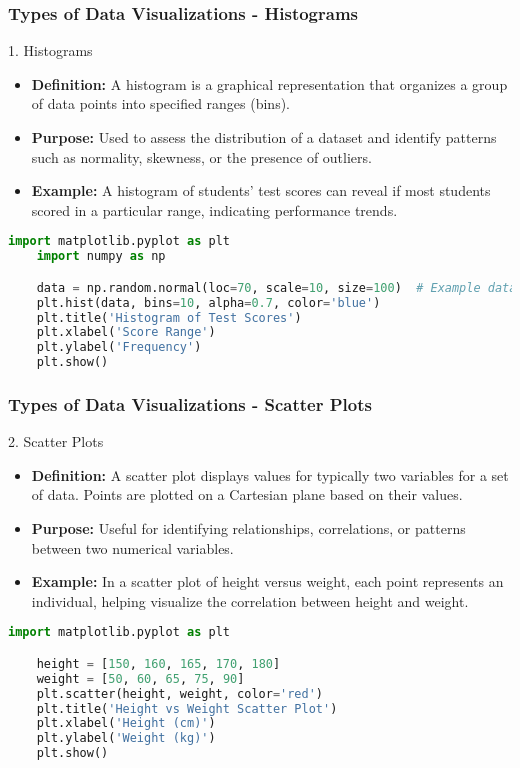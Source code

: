 \documentclass[aspectratio=169]{beamer}
\begin{document}
\begin{frame}[fragile]
    \frametitle{Types of Data Visualizations - Histograms}
    \begin{block}{1. Histograms}
        \begin{itemize}
            \item \textbf{Definition:} A histogram is a graphical representation that organizes a group of data points into specified ranges (bins). 
            \item \textbf{Purpose:} Used to assess the distribution of a dataset and identify patterns such as normality, skewness, or the presence of outliers.
            \item \textbf{Example:} A histogram of students' test scores can reveal if most students scored in a particular range, indicating performance trends.
        \end{itemize}
    \end{block}
    \begin{lstlisting}[language=Python]
    import matplotlib.pyplot as plt
    import numpy as np

    data = np.random.normal(loc=70, scale=10, size=100)  # Example data
    plt.hist(data, bins=10, alpha=0.7, color='blue')
    plt.title('Histogram of Test Scores')
    plt.xlabel('Score Range')
    plt.ylabel('Frequency')
    plt.show()
    \end{lstlisting}
\end{frame}

\begin{frame}[fragile]
    \frametitle{Types of Data Visualizations - Scatter Plots}
    \begin{block}{2. Scatter Plots}
        \begin{itemize}
            \item \textbf{Definition:} A scatter plot displays values for typically two variables for a set of data. Points are plotted on a Cartesian plane based on their values.
            \item \textbf{Purpose:} Useful for identifying relationships, correlations, or patterns between two numerical variables.
            \item \textbf{Example:} In a scatter plot of height versus weight, each point represents an individual, helping visualize the correlation between height and weight.
        \end{itemize}
    \end{block}
    \begin{lstlisting}[language=Python]
    import matplotlib.pyplot as plt

    height = [150, 160, 165, 170, 180]
    weight = [50, 60, 65, 75, 90]
    plt.scatter(height, weight, color='red')
    plt.title('Height vs Weight Scatter Plot')
    plt.xlabel('Height (cm)')
    plt.ylabel('Weight (kg)')
    plt.show()
    \end{lstlisting}
\end{frame}
\end{document}
